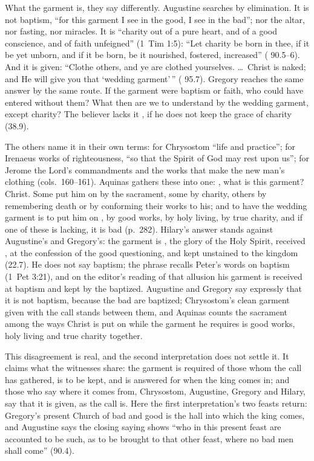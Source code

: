 What the garment is, they say differently. Augustine searches by elimination.
It is not baptism, ``for this garment I see in the good, I see in the bad'';
nor the altar, nor fasting, nor miracles. It is ``charity out of a pure heart,
and of a good conscience, and of faith unfeigned'' (1~Tim 1:5): ``Let charity
be born in thee, if it be yet unborn, and if it be born, be it nourished,
fostered, increased'' ( 90.5--6). And it is given: ``Clothe others,
and ye are clothed yourselves. \ldots\ Christ is naked; and He will give you
that `wedding garment'\,'' ( 95.7). Gregory reaches the same answer
by the same route. If the garment were baptism or faith, who could have
entered without them?  What then are we to understand by the wedding garment,
except charity? The believer lacks it , if he does not keep the grace of charity (38.9).

The others name it in their own terms: for Chrysostom ``life and practice'';
for Irenaeus works of righteousness, ``so that the Spirit of God may rest upon
us''; for Jerome the Lord's commandments and the works that make the new man's
clothing (cols.~160--161). Aquinas gathers these into one: , what is this garment? Christ. Some put him on by the
sacrament, some by charity, others by remembering death or by conforming their
works to his; and to have the wedding garment is to put him on , by good works, by holy living, by true charity, and if one
of these is lacking, it is bad (p.~282). Hilary's answer stands against Augustine's and
Gregory's: the garment is , the glory of the
Holy Spirit, received , at the
confession of the good questioning, and kept unstained to the kingdom (22.7).
He does not say baptism; the phrase recalls Peter's words on baptism (1~Pet
3:21), and on the editor's reading of that allusion his garment is received
at baptism and kept by the baptized. Augustine and Gregory say expressly that
it is not baptism, because the bad are baptized; Chrysostom's clean garment
given with the call stands between them, and Aquinas counts the sacrament
among the ways Christ is put on while the garment he requires is good works,
holy living and true charity together.

This disagreement is real, and the second interpretation does not settle it.
It claims what the witnesses share: the garment is required of those whom the
call has gathered, is to be kept, and is answered for when the king comes in;
and those who say where it comes from, Chrysostom, Augustine, Gregory and
Hilary, say that it is given, as the call is. Here the first interpretation's
two feasts return: Gregory's present Church of bad and good is the hall into
which the king comes, and Augustine says the closing saying shows ``who in
this present feast are accounted to be such, as to be brought to that other
feast, where no bad men shall come'' (90.4).

